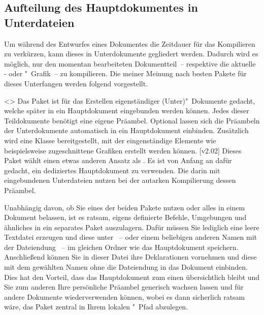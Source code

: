 \subsection{%
  Aufteilung des Hauptdokumentes in Unterdateien%
}
%
Um während des Entwurfes eines Dokumentes die Zeitdauer für das Kompilieren zu 
verkürzen, kann dieses in Unterdokumente gegliedert werden. Dadurch wird es 
möglich, nur den momentan bearbeiteten Dokumentteil~-- respektive die aktuelle 
- oder "~Grafik~-- zu kompilieren. Die meiner 
Meinung nach besten Pakete für dieses Unterfangen werden folgend vorgestellt.

\begin{DeclarePackages}
<>
  Das Paket ist für das Erstellen eigenständiger (Unter)"~Dokumente gedacht, 
  welche später in ein Hauptdokument eingebunden werden können. Jedes dieser 
  Teildokumente benötigt eine eigene Präambel. Optional lassen sich die 
  Präambeln der Unterdokumente automatisch in ein Hauptdokument einbinden. 
  Zusätzlich wird eine Klasse bereitgestellt, mit der eingenständige Elemente 
  wie beispielsweise zugeschnittene Grafiken erstellt werden können.
[v2.02]
  Dieses Paket wählt einen etwas anderen Ansatz als . Es 
  ist von Anfang an dafür gedacht, ein dediziertes Hauptdokument zu verwenden. 
  Die darin mit  eingebundenen Unterdateien nutzen bei der 
  autarken Kompilierung dessen Präambel.
\end{DeclarePackages}

Unabhängig davon, ob Sie eines der beiden Pakete nutzen oder alles in einem 
Dokument belassen, ist es ratsam, eigens definierte Befehle, Umgebungen und 
ähnliches in ein separates Paket auszulagern. Dafür müssen Sie lediglich eine 
leere Textdatei erzeugen und diese unter ~-- oder einem 
beliebigen anderen Namen mit der Dateiendung ~-- im gleichen Ordner 
wie das Hauptdokument speichern. Anschließend können Sie in dieser Datei ihre 
Deklarationen vornehmen und diese mit dem gewählten Namen ohne die Dateiendung
 in das Dokument einbinden. Dies hat 
den Vorteil, dass das Hauptdokument zum einen übersichtlich bleibt und Sie zum 
anderen Ihre persönliche Präambel generisch wachsen lassen und für andere 
Dokumente wiederverwenden können, wobei es dann sicherlich ratsam wäre, das 
Paket zentral in Ihrem lokalen "~Pfad abzulegen. 



